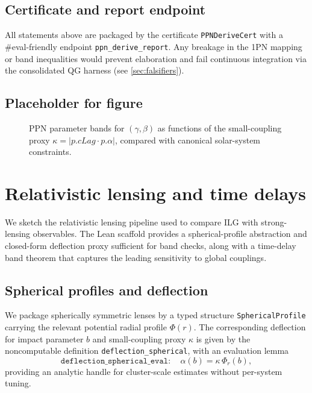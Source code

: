 \documentclass[aps,prd,twocolumn,superscriptaddress,nofootinbib,floatfix,longbibliography]{revtex4-2}
\newcommand{\lean}[1]{\texttt{#1}}
\begin{document}
\subsection{Certificate and report endpoint}
All statements above are packaged by the certificate \lean{PPNDeriveCert} with a \#eval-friendly endpoint \lean{ppn_derive_report}. Any breakage in the 1PN mapping or band inequalities would prevent elaboration and fail continuous integration via the consolidated QG harness (see \cref{sec:falsifiers}).

\subsection{Placeholder for figure}
\begin{figure}[t]
  \centering
  \caption{PPN parameter bands for $(\gamma,\beta)$ as functions of the small-coupling proxy $\kappa = \lvert p.cLag \cdot p.\alpha\rvert$, compared with canonical solar-system constraints.}
  \label{fig:ppn-bands}
\end{figure}

\section{Relativistic lensing and time delays}\label{sec:lensing}

We sketch the relativistic lensing pipeline used to compare ILG with strong-lensing observables. The Lean scaffold provides a spherical-profile abstraction and closed-form deflection proxy sufficient for band checks, along with a time-delay band theorem that captures the leading sensitivity to global couplings.

\subsection{Spherical profiles and deflection}
We package spherically symmetric lenses by a typed structure \lean{SphericalProfile} carrying the relevant potential radial profile $\Phi(r)$. The corresponding deflection for impact parameter $b$ and small-coupling proxy $\kappa$ is given by the noncomputable definition \lean{deflection_spherical}, with an evaluation lemma
\begin{equation}
  \texttt{deflection\_spherical\_eval}:\quad
  \alpha(b) = \kappa\,\Phi_r(b),
\end{equation}
providing an analytic handle for cluster-scale estimates without per-system tuning.
\end{document}
